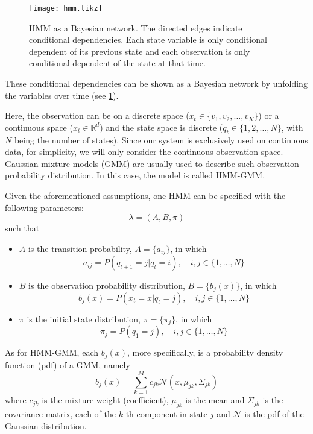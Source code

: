 \documentclass[12pt,final,twoside]{report}
\begin{document}
\begin{figure}[t]
  \centering
  \texttt{[image: hmm.tikz]}
  \caption[HMM as a Bayesian network.]{HMM as a Bayesian network. The directed edges indicate conditional dependencies. Each state variable is only conditional dependent of its previous state and each observation is only conditional dependent of the state at that time.}
  \label{fig:hmm}
\end{figure}

These conditional dependencies can be shown as a Bayesian network by unfolding the variables over time (see \cref{fig:hmm}).

Here, the observation can be on a discrete space ($x_t \in \{v_1, v_2, \dots, v_K\}$) or a continuous space ($x_t \in \mathbb{R}^d$) and the state space is discrete ($q_t \in \{1, 2, \dots, N\}$, with $N$ being the number of states). Since our system is exclusively used on continuous data, for simplicity, we will only consider the continuous observation space. Gaussian mixture models (GMM) are usually used to describe such observation probability distribution. In this case, the model is called HMM-GMM.

Given the aforementioned assumptions, one HMM can be specified with the following parameters:
\[ \lambda = (A, B, \pi) \]
such that
\begin{itemize}
  \item $A$ is the transition probability, $A = \{a_{ij}\}$, in which 
    \[ a_{ij} = P(q_{t+1} = j | q_t = i), \quad i,j \in \{1, \dots, N\} \]
  \item $B$ is the observation probability distribution, $B = \{b_j(x)\}$, in which
    \[ b_j(x) = P(x_t = x | q_t = j), \quad i,j \in \{1, \dots, N\} \]
  \item $\pi$ is the initial state distribution, $\pi = \{\pi_j\}$, in which
    \[ \pi_j = P(q_1 = j), \quad i,j \in \{1, \dots, N\} \]
\end{itemize}

As for HMM-GMM, each $b_j(x)$, more specifically, is a probability density function (pdf) of a GMM, namely
\[ b_j(x) = \sum_{k=1}^M c_{jk} \mathcal{N}(x, \mu_{jk}, \Sigma_{jk}) \]
where $c_{jk}$ is the mixture weight (coefficient), $\mu_{jk}$ is the mean and $\Sigma_{jk}$ is the covariance matrix, each of the $k$-th component in state $j$ and $\mathcal{N}$ is the pdf of the Gaussian distribution. 
\end{document}
